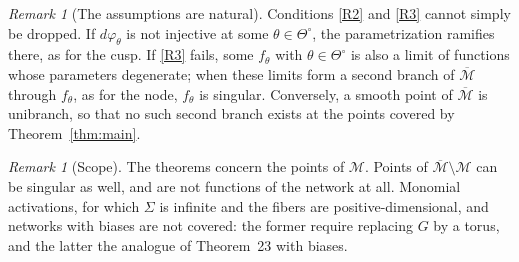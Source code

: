\documentclass[11pt]{article}
\theoremstyle{definition}
\theoremstyle{remark}
\newtheorem{remark}[lemma]{Remark}
\newcommand{\M}{\mathcal{M}}
\newcommand{\Mbar}{\overline{\M}}
\newcommand{\sm}{\setminus}
\newcommand{\To}{\Theta^{\circ}}
\begin{document}
\begin{remark}[The assumptions are natural]
Conditions \ref{R2} and \ref{R3} cannot simply be dropped. If $d\varphi_\theta$ is not injective at some $\theta\in\To$, the parametrization ramifies there, as for the cusp. If \ref{R3} fails, some $f_\theta$ with $\theta\in\To$ is also a limit of functions whose parameters degenerate; when these limits form a second branch of $\Mbar$ through $f_\theta$, as for the node, $f_\theta$ is singular. Conversely, a smooth point of $\Mbar$ is unibranch, so that no such second branch exists at the points covered by Theorem~\ref{thm:main}.
\end{remark}

\begin{remark}[Scope]
The theorems concern the points of $\M$. Points of $\Mbar\sm\M$ can be singular as well, and are not functions of the network at all. Monomial activations, for which $\Sigma$ is infinite and the fibers are positive-dimensional, and networks with biases are not covered: the former require replacing $G$ by a torus, and the latter the analogue of Theorem~23 with biases.
\end{remark}
\end{document}
